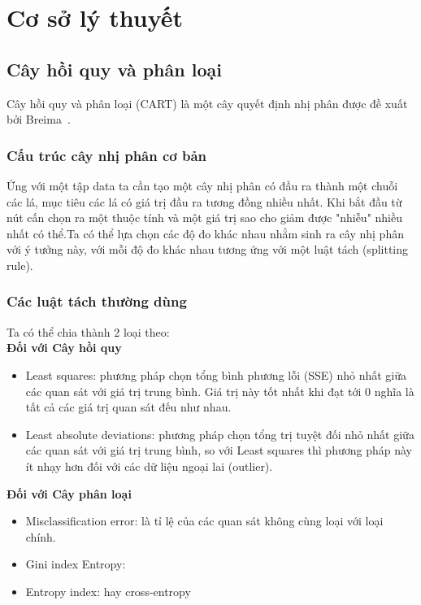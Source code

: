 \chapter{Cơ sở lý thuyết} \label{chap-models}
\section{Cây hồi quy và phân loại}
Cây hồi quy và phân loại (CART) là một cây quyết định nhị phân được đề xuất bởi Breima~\cite{1}.\\

\subsection{Cấu trúc cây nhị phân cơ bản}
 Ứng  với một tập data ta cần tạo một  cây nhị phân có đầu ra thành một chuỗi các lá, mục tiêu các lá có giá trị đầu ra tương đồng nhiều nhất. Khi bắt đầu từ nút cấn chọn ra một thuộc tính và một giá trị sao cho giảm được "nhiễu" nhiều nhất có thể.Ta có thể lựa chọn các độ đo khác nhau nhằm sinh ra cây nhị phân với ý tưởng này, với mỗi độ đo khác nhau tương ứng với một luật tách (splitting rule).\\
\subsection{Các luật tách thường dùng} Ta có thể chia thành 2 loại theo:\\
\textbf{Đối với Cây hồi quy} %
\begin{itemize}
\item Least squares: phương pháp chọn tổng bình phương lỗi (SSE) nhỏ nhất giữa các quan sát với giá trị trung bình. Giá trị này tốt nhất khi đạt tới 0 nghĩa là tất cả các giá trị quan sát đếu như nhau.
\item Least absolute deviations: phương pháp chọn tổng  trị tuyệt đối nhỏ nhất giữa các quan sát với giá trị trung bình, so với Least squares thì phương pháp này ít nhạy hơn đối với các dữ liệu ngoại lai (outlier). 
\end{itemize}
\textbf{Đối với Cây phân loại} %
\begin{itemize}
\item Misclassification error: là tỉ lệ của các quan sát không cùng loại với loại chính. 
\item Gini index  Entropy: %
\item Entropy index: hay cross-entropy %
\end{itemize}

